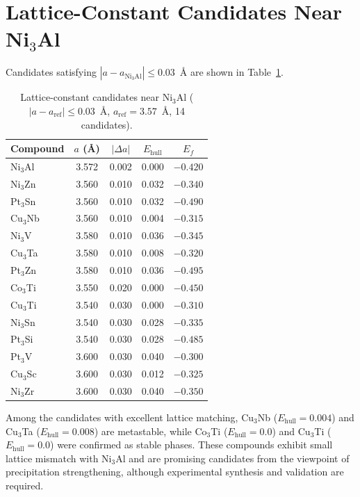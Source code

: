 \documentclass[5p,twocolumn]{elsarticle}
\begin{document}
\section{Lattice-Constant Candidates Near Ni$_3$Al}
\label{sec:sup_lattice_match}

Candidates satisfying $|a - a_{\text{Ni}_3\text{Al}}| \leq 0.03$~\AA{} are
shown in Table~\ref{tab:sup_lattice_match}.

\begin{table}[htbp]
  \centering
  \caption{Lattice-constant candidates near Ni$_3$Al ($|a - a_{\text{ref}}| \leq 0.03$~\AA, $a_{\text{ref}} = 3.57$~\AA, 14 candidates).}
  \label{tab:sup_lattice_match}
  \small
  \begin{tabular}{lcccc}
    \toprule
    Compound & $a$ (\AA) & $|\Delta a|$ & $E_\text{hull}$ & $E_f$ \\
    \midrule
    Ni$_3$Al & 3.572 & 0.002 & 0.000 & $-0.420$ \\
    Ni$_3$Zn & 3.560 & 0.010 & 0.032 & $-0.340$ \\
    Pt$_3$Sn & 3.560 & 0.010 & 0.032 & $-0.490$ \\
    Cu$_3$Nb & 3.560 & 0.010 & 0.004 & $-0.315$ \\
    Ni$_3$V & 3.580 & 0.010 & 0.036 & $-0.345$ \\
    Cu$_3$Ta & 3.580 & 0.010 & 0.008 & $-0.320$ \\
    Pt$_3$Zn & 3.580 & 0.010 & 0.036 & $-0.495$ \\
    Co$_3$Ti & 3.550 & 0.020 & 0.000 & $-0.450$ \\
    Cu$_3$Ti & 3.540 & 0.030 & 0.000 & $-0.310$ \\
    Ni$_3$Sn & 3.540 & 0.030 & 0.028 & $-0.335$ \\
    Pt$_3$Si & 3.540 & 0.030 & 0.028 & $-0.485$ \\
    Pt$_3$V & 3.600 & 0.030 & 0.040 & $-0.300$ \\
    Cu$_3$Sc & 3.600 & 0.030 & 0.012 & $-0.325$ \\
    Ni$_3$Zr & 3.600 & 0.030 & 0.040 & $-0.350$ \\
    \bottomrule
  \end{tabular}
\end{table}

Among the candidates with excellent lattice matching,
Cu$_3$Nb ($E_\text{hull} = 0.004$) and Cu$_3$Ta ($E_\text{hull} = 0.008$) are
metastable, while Co$_3$Ti ($E_\text{hull} = 0.0$) and Cu$_3$Ti ($E_\text{hull} = 0.0$) were
confirmed as stable phases.
These compounds exhibit small lattice mismatch with Ni$_3$Al and are
promising candidates from the viewpoint of precipitation strengthening,
although experimental synthesis and validation are required.
\end{document}
